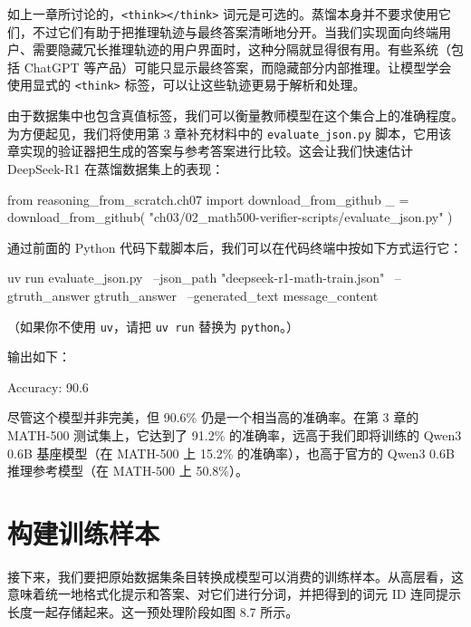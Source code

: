 如上一章所讨论的，\texttt{\textless{}think\textgreater{}\textless{}/think\textgreater{}} 词元是可选的。蒸馏本身并不要求使用它们，不过它们有助于把推理轨迹与最终答案清晰地分开。当我们实现面向终端用户、需要隐藏冗长推理轨迹的用户界面时，这种分隔就显得很有用。有些系统（包括 ChatGPT 等产品）可能只显示最终答案，而隐藏部分内部推理。让模型学会使用显式的 \texttt{\textless{}think\textgreater{}} 标签，可以让这些轨迹更易于解析和处理。

由于数据集中也包含真值标签，我们可以衡量教师模型在这个集合上的准确程度。为方便起见，我们将使用第 3 章补充材料中的 \texttt{evaluate\_json.py} 脚本，它用该章实现的验证器把生成的答案与参考答案进行比较。这会让我们快速估计 DeepSeek-R1 在蒸馏数据集上的表现：

\begin{codebox}
from reasoning_from_scratch.ch07 import download_from_github
_ = download_from_github(
    "ch03/02_math500-verifier-scripts/evaluate_json.py"
)
\end{codebox}

通过前面的 Python 代码下载脚本后，我们可以在代码终端中按如下方式运行它：

\begin{codebox}
uv run evaluate_json.py \
--json_path "deepseek-r1-math-train.json" \
--gtruth_answer gtruth_answer \
--generated_text message_content
\end{codebox}

（如果你不使用 \texttt{uv}，请把 \texttt{uv run} 替换为 \texttt{python}。）

输出如下：

\begin{codebox}
Accuracy: 90.6%
\end{codebox}

尽管这个模型并非完美，但 90.6\% 仍是一个相当高的准确率。在第 3 章的 MATH-500 测试集上，它达到了 91.2\% 的准确率，远高于我们即将训练的 Qwen3 0.6B 基座模型（在 MATH-500 上 15.2\% 的准确率），也高于官方的 Qwen3 0.6B 推理参考模型（在 MATH-500 上 50.8\%）。

\section{构建训练样本}

接下来，我们要把原始数据集条目转换成模型可以消费的训练样本。从高层看，这意味着统一地格式化提示和答案、对它们进行分词，并把得到的词元 ID 连同提示长度一起存储起来。这一预处理阶段如图 8.7 所示。


